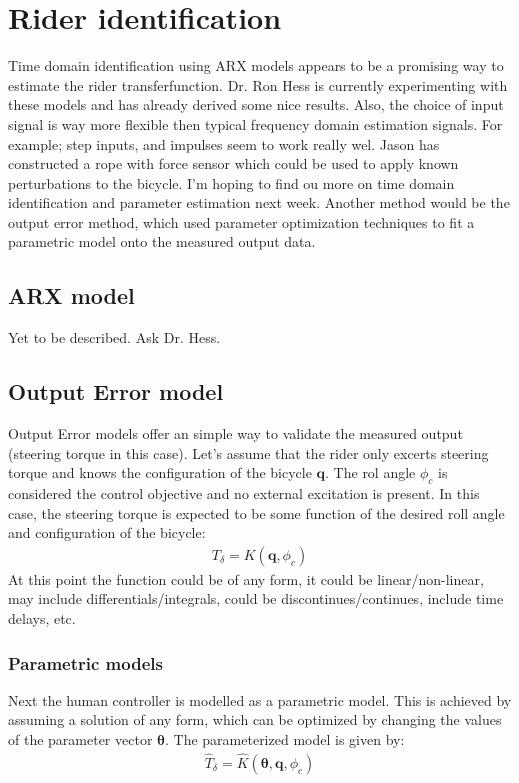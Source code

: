 \chapter{Rider identification}
Time domain identification using ARX models appears to be a promising way to estimate the rider transferfunction. Dr. Ron Hess is currently experimenting with these models and has already derived some nice results. Also, the choice of input signal is way more flexible then typical frequency domain estimation signals. For example; step inputs, and impulses seem to work really wel. Jason has constructed a rope with force sensor which could be used to apply known perturbations to the bicycle. I'm hoping to find ou more on time domain identification and parameter estimation next week. Another method would be the output error method, which used parameter optimization techniques to fit a parametric model onto the measured output data.
\section{ARX model}
Yet to be described. Ask Dr. Hess.
\section{Output Error model}
Output Error models offer an simple way to validate the measured output (steering torque in this case). Let's assume that the rider only excerts steering torque and knows the configuration of the bicycle $\mathbf{q}$. The rol angle $\phi_c$ is considered the control objective and no external excitation is present. In this case, the steering torque is expected to be some function of the desired roll angle and configuration of the bicycle:
		\begin{align}
		T_\delta = {K}(\mathbf{q},\phi_c)
		\end{align}
At this point the function could be of any form, it could be linear/non-linear,  may include differentials/integrals, could be discontinues/continues, include time delays, etc. %
%
\subsection{Parametric models}
Next the human controller is modelled as a parametric model. This is achieved by assuming a solution of any form, which can be optimized by changing the values of the parameter vector $\boldsymbol{\theta}$. The parameterized model is given by:
		\begin{align}
		\hat{T}_\delta = \hat{K}(\boldsymbol{\theta},\mathbf{q},\phi_c)
		\end{align}
